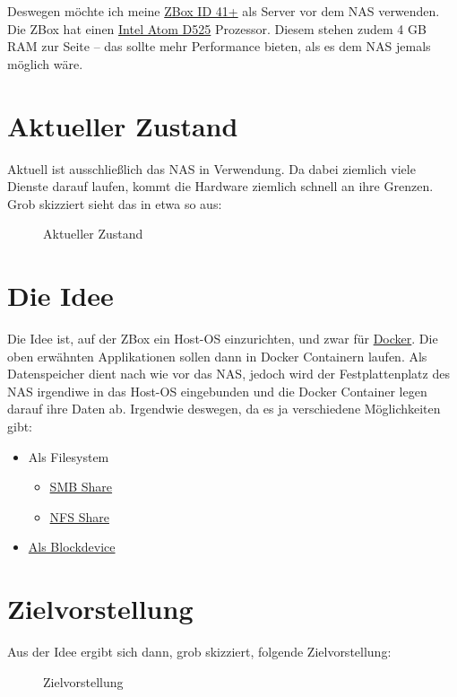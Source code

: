 \documentclass[12pt,a4paper]{article}
\newcommand{\jpaimg}[2]{\begin{figure}[H]\centering\fbox{\texttt{[image: \#1]}}\caption{#2}\label{fig:#2}\end{figure}}
\begin{document}
Deswegen möchte ich meine \href{https://www.zotac.com/us/product/mini_pcs/id41-plus}{ZBox ID 41+} als Server vor dem
NAS verwenden. Die ZBox hat einen \href{https://de.wikipedia.org/wiki/Intel_Atom}{Intel Atom D525} Prozessor. Diesem
stehen zudem 4 GB RAM zur Seite -- das sollte mehr Performance bieten, als es dem NAS jemals möglich wäre.

\section{Aktueller Zustand}
Aktuell ist ausschließlich das NAS in Verwendung. Da dabei ziemlich viele Dienste darauf laufen, kommt die Hardware
ziemlich schnell an ihre Grenzen. Grob skizziert sieht das in etwa so aus:

\jpaimg{./images/DS411Slim.png}{Aktueller Zustand}

\section{Die Idee}
Die Idee ist, auf der ZBox ein Host-OS einzurichten, und zwar für
\href{https://de.wikipedia.org/wiki/Docker_(Software)}{Docker}. Die oben erwähnten Applikationen sollen dann in Docker
Containern laufen. Als Datenspeicher dient nach wie vor das NAS, jedoch wird der Festplattenplatz des NAS irgendiwe
in das Host-OS eingebunden und die Docker Container legen darauf ihre Daten ab. Irgendwie deswegen, da es ja
verschiedene Möglichkeiten gibt:

\begin{itemize}
    \item Als Filesystem
    \begin{itemize}
        \item \href{https://de.wikipedia.org/wiki/Server_Message_Block}{SMB Share}
        \item \href{https://de.wikipedia.org/wiki/Network_File_System}{NFS Share}
    \end{itemize}
    \item \href{https://de.wikipedia.org/wiki/ISCSI}{Als Blockdevice}
\end{itemize}

\section{Zielvorstellung}
Aus der Idee ergibt sich dann, grob skizziert, folgende Zielvorstellung:

\jpaimg{./images/ZBoxDS411Slim.png}{Zielvorstellung}
\end{document}
